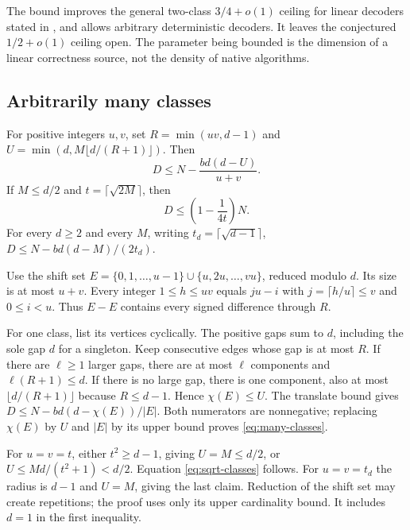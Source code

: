 The bound improves the general two-class $3/4+o(1)$ ceiling for linear
decoders stated in \cite[Open problems]{SeventeenthPaper2026}, and allows
arbitrary deterministic decoders. It leaves the conjectured
$1/2+o(1)$ ceiling open. The parameter being bounded is the dimension of
a linear correctness source, not the density of native algorithms.

\subsection{Arbitrarily many classes}

\begin{theorem}\label{thm:many-classes}
For positive integers $u,v$, set
$R=\min(uv,d-1)$ and $U=\min(d,M\lfloor d/(R+1)\rfloor)$.
Then
\begin{equation}\label{eq:many-classes}
 D\le N-\frac{bd(d-U)}{u+v}.
\end{equation}
If $M\le d/2$ and $t=\lceil\sqrt{2M}\rceil$, then
\begin{equation}\label{eq:sqrt-classes}
 D\le\left(1-\frac1{4t}\right)N.
\end{equation}
For every $d\ge2$ and every $M$, writing $t_d=\lceil\sqrt{d-1}\rceil$,
$D\le N-bd(d-M)/(2t_d)$.
\end{theorem}
\begin{outline}
Use the shift set
$E=\{0,1,\ldots,u-1\}\cup\{u,2u,\ldots,vu\}$, reduced modulo $d$.
Its size is at most $u+v$. Every integer $1\le h\le uv$ equals $ju-i$
with $j=\lceil h/u\rceil\le v$ and $0\le i<u$. Thus $E-E$ contains
every signed difference through $R$.

For one class, list its vertices cyclically. The positive gaps sum to
$d$, including the sole gap $d$ for a singleton. Keep consecutive edges
whose gap is at most $R$. If there are $\ell\ge1$ larger gaps, there
are at most $\ell$ components and $\ell(R+1)\le d$. If there is no
large gap, there is one component, also at most $\lfloor d/(R+1)\rfloor$
because $R\le d-1$. Hence $\chi(E)\le U$.
The translate bound gives $D\le N-bd(d-\chi(E))/|E|$.
Both numerators are nonnegative; replacing $\chi(E)$ by $U$ and
$|E|$ by its upper bound proves \eqref{eq:many-classes}.

For $u=v=t$, either $t^2\ge d-1$, giving $U=M\le d/2$, or
$U\le Md/(t^2+1)<d/2$. Equation \eqref{eq:sqrt-classes} follows.
For $u=v=t_d$ the radius is $d-1$ and $U=M$, giving the last claim.
Reduction of the shift set may create repetitions; the proof uses only
its upper cardinality bound. It includes $d=1$ in the first inequality.
\end{outline}

